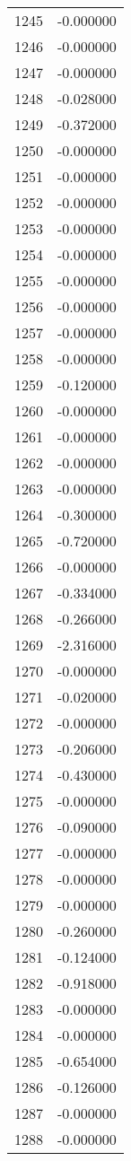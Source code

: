 \documentclass[12pt]{article}
\begin{document}
\begin{longtable}{@{}cc@{}}
1245 & -0.000000 \\
1246 & -0.000000 \\
1247 & -0.000000 \\
1248 & -0.028000 \\
1249 & -0.372000 \\
1250 & -0.000000 \\
1251 & -0.000000 \\
1252 & -0.000000 \\
1253 & -0.000000 \\
1254 & -0.000000 \\
1255 & -0.000000 \\
1256 & -0.000000 \\
1257 & -0.000000 \\
1258 & -0.000000 \\
1259 & -0.120000 \\
1260 & -0.000000 \\
1261 & -0.000000 \\
1262 & -0.000000 \\
1263 & -0.000000 \\
1264 & -0.300000 \\
1265 & -0.720000 \\
1266 & -0.000000 \\
1267 & -0.334000 \\
1268 & -0.266000 \\
1269 & -2.316000 \\
1270 & -0.000000 \\
1271 & -0.020000 \\
1272 & -0.000000 \\
1273 & -0.206000 \\
1274 & -0.430000 \\
1275 & -0.000000 \\
1276 & -0.090000 \\
1277 & -0.000000 \\
1278 & -0.000000 \\
1279 & -0.000000 \\
1280 & -0.260000 \\
1281 & -0.124000 \\
1282 & -0.918000 \\
1283 & -0.000000 \\
1284 & -0.000000 \\
1285 & -0.654000 \\
1286 & -0.126000 \\
1287 & -0.000000 \\
1288 & -0.000000 \\

\end{longtable}
\end{document}
